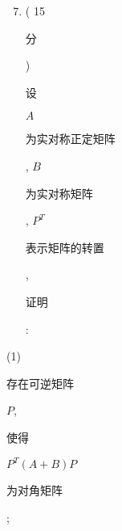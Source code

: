 \documentclass[10pt]{article}
\begin{document}
\begin{enumerate}
  \setcounter{enumi}{6}
  \item ( 15 \begin{CJK}{UTF8}{mj}分\end{CJK}) \begin{CJK}{UTF8}{mj}设\end{CJK} $A$ \begin{CJK}{UTF8}{mj}为实对称正定矩阵\end{CJK}, $B$ \begin{CJK}{UTF8}{mj}为实对称矩阵\end{CJK}, $P^{T}$ \begin{CJK}{UTF8}{mj}表示矩阵的转置\end{CJK}, \begin{CJK}{UTF8}{mj}证明\end{CJK}:
\end{enumerate}
(1) \begin{CJK}{UTF8}{mj}存在可逆矩阵\end{CJK} $P$, \begin{CJK}{UTF8}{mj}使得\end{CJK} $P^{T}(A+B) P$ \begin{CJK}{UTF8}{mj}为对角矩阵\end{CJK};
\end{document}
